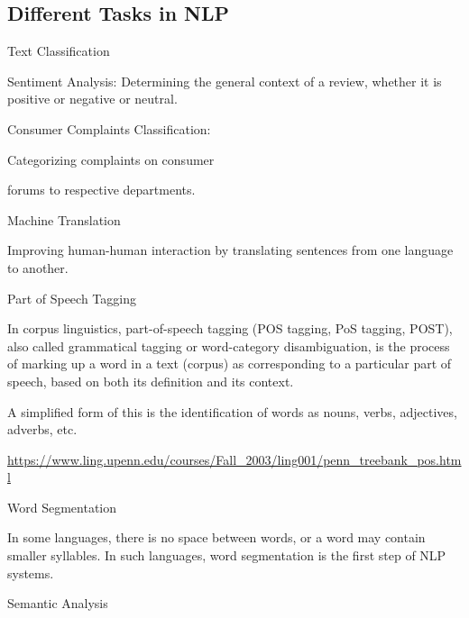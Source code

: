 	\subsection{Different Tasks in NLP}
	\begin{bulletedlist}
		\item Text Classification
		\begin{bulletedlist}
			\item Sentiment Analysis: Determining the general context of a review, whether it is positive or negative or neutral.
			\item Consumer Complaints Classification:
			\begin{bulletedlist}
				\item Categorizing complaints on consumer
				\item forums to respective departments.
			\end{bulletedlist}
		\end{bulletedlist}
		\item Machine Translation
		\begin{bulletedlist}
			\item Improving human-human interaction by translating sentences from one language to another.
		\end{bulletedlist}
		\item Part of Speech Tagging
		\begin{bulletedlist}
			\item In corpus linguistics, part-of-speech tagging (POS tagging, PoS tagging, POST), also called grammatical tagging or word-category disambiguation, is the process of marking up a word in a text (corpus) as corresponding to a particular part of speech, based on both its definition and its context.
			\item A simplified form of this is the identification of words as nouns, verbs, adjectives, adverbs, etc.
			\item \href{Tag-set}{https://www.ling.upenn.edu/courses/Fall\_2003/ling001/penn\_treebank\_pos.html}
		\end{bulletedlist}
		\item Word Segmentation
		\begin{bulletedlist}
			\item In some languages, there is no space between words, or a word may contain smaller syllables. In such languages, word segmentation is the first step of NLP systems.
		\end{bulletedlist}
		\item Semantic Analysis

\end{bulletedlist}
